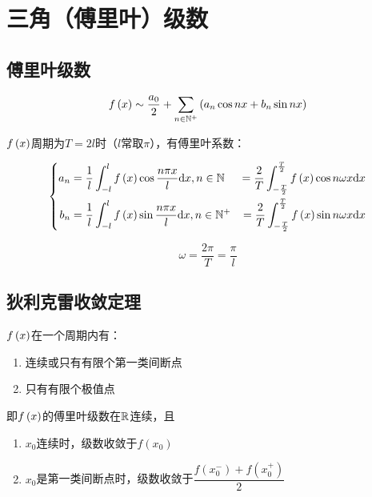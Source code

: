 \documentclass{article}
\begin{document}
\section{三角（傅里叶）级数}

\subsection{傅里叶级数}

\[f\left(x\right)\sim
    \frac{a_0}2+\sum_{n\in\mathbb N^+}\left(a_n\cos nx+b_n\sin nx\right)\]

$f\left(x\right)$周期为$T=2l$时（$l$常取$\pi$），有傅里叶系数：

\[\left\{\begin{aligned}
        a_n & =\frac1l\int_{-l}^lf\left(x\right)\cos\frac{n\pi x}l\mathrm d x,n\in\mathbb N  & =\frac2T\int_{-\frac T2}^{\frac T2}f\left(x\right)\cos n\omega x\mathrm d x \\
        b_n & =\frac1l\int_{-l}^lf\left(x\right)\sin\frac{n\pi x}l\mathrm d x,n\in\mathbb N^+ & =\frac2T\int_{-\frac T2}^{\frac T2}f\left(x\right)\sin n\omega x\mathrm d x
    \end{aligned}\right.\]

\[\omega=\frac{2\pi}T=\frac\pi l\]

\subsection{狄利克雷收敛定理}

$f\left(x\right)$在一个周期内有：

\begin{enumerate}
    \item 连续或只有有限个第一类间断点
    \item 只有有限个极值点
\end{enumerate}

即$f\left(x\right)$的傅里叶级数在$\mathbb R$连续，且

\begin{enumerate}
    \item $x_0$连续时，级数收敛于$f(x_0)$
    \item $x_0$是第一类间断点时，级数收敛于$\dfrac{f(x_0^-)+f(x_0^+)}2$
\end{enumerate}
\end{document}

